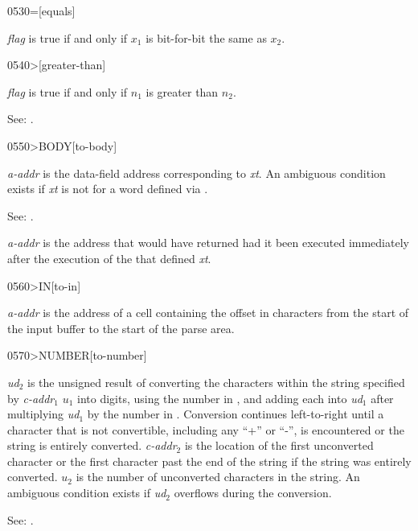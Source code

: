 \begin{newword}{0530}{=}[equals]

	\emph{flag} is true if and only if $x_1$ is bit-for-bit the
	same as $x_2$.
\end{newword}


\begin{newword}[more]{0540}{>}[greater-than]

	\emph{flag} is true if and only if $n_1$ is greater than $n_2$.

\item[See:]
	.
\end{newword}


\begin{newword}[toBODY]{0550}{>BODY}[to-body]

	\emph{a-addr} is the data-field address corresponding to
	\emph{xt}. An ambiguous condition exists if \emph{xt} is not
	for a word defined via .

\item[See:]
	.

	\begin{rationale} %
		\emph{a-addr} is the address that  would have
		returned had it been executed immediately after the execution
		of the  that defined \emph{xt}.
	\end{rationale}
\end{newword}


\begin{newword}[toIN]{0560}{>IN}[to-in]

	\emph{a-addr} is the address of a cell containing the offset in
	characters from the start of the input buffer to the start of
	the parse area.
\end{newword}


\begin{newword}[toNUMBER]{0570}{>NUMBER}[to-number]

	\emph{ud}$_2$ is the unsigned result of converting the
	characters within the string specified by \emph{c-addr}$_1$
	$u_1$ into digits, using the number in , and adding
	each into \emph{ud}$_1$ after multiplying \emph{ud}$_1$ by the
	number in . Conversion continues left-to-right until
	a character that is not convertible, including any ``+'' or
	``-'', is encountered or the string is entirely converted.
	\emph{c-addr}$_2$ is the location of the first unconverted
	character or the first character past the end of the string if
	the string was entirely converted. $u_2$ is the number of
	unconverted characters in the string. An ambiguous condition
	exists if \emph{ud}$_2$ overflows during the conversion.

\item[See:]
	.
\end{newword}


